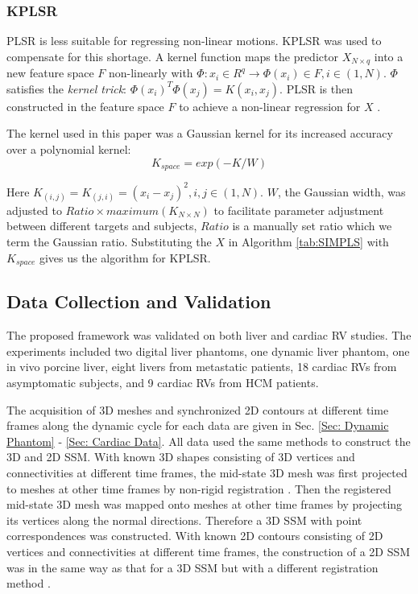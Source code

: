 \documentclass[review]{elsarticle}
\begin{document}
\subsubsection{KPLSR}
PLSR is less suitable for regressing non-linear motions. KPLSR was used to compensate for this shortage. A kernel function maps the predictor $X_{N\times q}$ into a new feature space $F$ non-linearly with $\Phi: x_i\in R^q \rightarrow \Phi(x_i)\in F, i\in(1,N)$. $\Phi$ satisfies the \textit{kernel trick}: ${\Phi(x_i)}^T\Phi(x_j)=K(x_i,x_j)$. PLSR is then constructed in the feature space $F$ to achieve a non-linear regression for $X$ \citep{rosipal2001kernel}.

The kernel used in this paper was a Gaussian kernel for its increased accuracy over a polynomial kernel:
\begin{equation}
K_{space}=exp(-K/W)
\end{equation}

Here $K_{(i,j)}=K_{(j,i)}=(x_i-x_j)^2,i,j\in (1,N)$. $W$, the Gaussian width, was adjusted to $Ratio\times maximum(K_{N\times N})$ to facilitate parameter adjustment between different targets and subjects, $Ratio$ is a manually set ratio which we term the Gaussian ratio. Substituting the $X$ in Algorithm \ref{tab:SIMPLS} with $K_{space}$ gives us the algorithm for KPLSR.

\subsection{Data Collection and Validation}
\label{Sec: Data}
The proposed framework was validated on both liver and cardiac RV studies. The experiments included two digital liver phantoms, one dynamic liver phantom, one in vivo porcine liver, eight livers from metastatic patients, 18 cardiac RVs from asymptomatic subjects, and 9 cardiac RVs from HCM patients.

The acquisition of 3D meshes and synchronized 2D contours at different time frames along the dynamic cycle for each data are given in Sec. \ref{Sec: Dynamic Phantom} - \ref{Sec: Cardiac Data}. All data used the same methods to construct the 3D and 2D SSM. With known 3D shapes consisting of 3D vertices and connectivities at different time frames, the mid-state 3D mesh was first projected to meshes at other time frames by non-rigid registration \citep{nonrigidICP}. Then the registered mid-state 3D mesh was mapped onto meshes at other time frames by projecting its vertices along the normal directions. Therefore a 3D SSM with point correspondences was constructed. With known 2D contours consisting of 2D vertices and connectivities at different time frames, the construction of a 2D SSM was in the same way as that for a 3D SSM but with a different registration method \citep{Shapecontext}.
\end{document}
